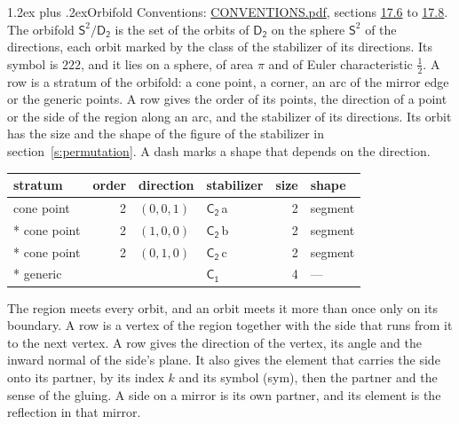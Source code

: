 \documentclass[10pt,a4paper]{article}
\makeatletter
\renewcommand\section{\@startsection{section}{1}{\z@}{-3ex plus -1ex minus -.2ex}%
  {1.2ex plus .2ex}{\normalfont\large\sffamily\bfseries\color{parttitle}}}
\numberwithin{equation}{section}
\newcommand{\grp}[1]{\mathsf{#1}}
\newcommand{\orbname}[1]{#1}
\newcommand{\clsletter}[1]{\,{\scriptsize\color{black!55}#1}}
\newcommand{\dirvec}[3]{(#1, #2, #3)}
\newcommand{\twosphere}{\mathsf{S}^{2}}
\makeatother
\begin{document}
\section{Orbifold}\label{s:orbifold}
Conventions: \href{../../CONVENTIONS.pdf}{CONVENTIONS.pdf}, sections \href{../../CONVENTIONS.pdf\#conv.17.6}{17.6} to \href{../../CONVENTIONS.pdf\#conv.17.8}{17.8}.
The orbifold $\twosphere/\grp{D_{2}}$ is the set of the orbits of $\grp{D_{2}}$ on the sphere $\twosphere$ of the directions, each orbit marked by the class of the stabilizer of its directions. Its symbol is $\orbname{222}$, and it lies on a sphere, of area $\pi$ and of Euler characteristic $\tfrac{1}{2}$.
\leavevmode\label{n:head.stratum}\label{n:head.order.point}\label{n:head.direction}\label{n:head.stabilizer}\label{n:head.size.orbit}\label{n:head.shape}A row is a stratum of the orbifold: a cone point, a corner, an arc of the mirror edge or the generic points. A row gives the order of its points, the direction of a point or the side of the region along an arc, and the stabilizer of its directions. Its orbit has the size and the shape of the figure of the stabilizer in section~\ref{s:permutation}. A dash marks a shape that depends on the direction.
{\small\setlength{\tabcolsep}{4pt}\begin{longtable}{@{}lrllrl@{}}\toprule
stratum & order & direction & stabilizer & size & shape\\\midrule\endhead
\bottomrule\endfoot\endlastfoot
cone point & 2 & $\dirvec{0}{0}{1}$ & \href{C2.pdf}{$\grp{C_{2}}$}\clsletter{a} & 2 & segment\\*
cone point & 2 & $\dirvec{1}{0}{0}$ & \href{C2.pdf}{$\grp{C_{2}}$}\clsletter{b} & 2 & segment\\*
cone point & 2 & $\dirvec{0}{1}{0}$ & \href{C2.pdf}{$\grp{C_{2}}$}\clsletter{c} & 2 & segment\\*
generic &  &  & \href{C1.pdf}{$\grp{C_{1}}$} & 4 & ---\\
\bottomrule\end{longtable}}
\leavevmode\label{n:head.vertex.region}\label{n:head.angle}\label{n:head.normal.side}\label{n:head.partner}\label{n:head.sense}The region meets every orbit, and an orbit meets it more than once only on its boundary. A row is a vertex of the region together with the side that runs from it to the next vertex. A row gives the direction of the vertex, its angle and the inward normal of the side's plane. It also gives the element that carries the side onto its partner, by its index $k$ and its symbol (sym), then the partner and the sense of the gluing. A side on a mirror is its own partner, and its element is the reflection in that mirror.
\end{document}
